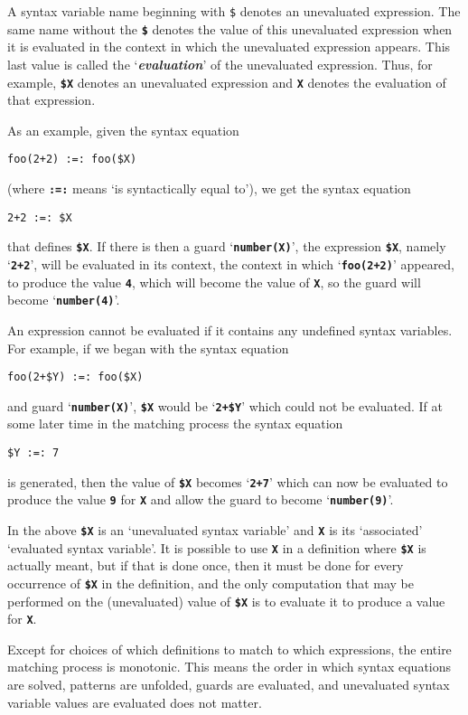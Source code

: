 \documentclass[12pt]{article}
\makeatletter
\newcommand{\TT}[1]{{\tt \bfseries #1}}
\newcommand{\key}[1]{{\bf \em #1}\index{#1}}
\newcommand{\ttmnbkey}[2]{{\tt #1}\index{#1@{\tt #1}!#2}}
\makeatother
\begin{document}
A syntax variable name beginning with
\ttmnbkey{\$}{in syntax variable name} denotes an unevaluated
expression.  The same name without the \TT{\$} denotes the value
of this unevaluated expression when it is evaluated
in the context in which the unevaluated expression appears.
This last value is called the `\key{evaluation}' of the unevaluated
expression.  Thus, for example, \TT{\$X} denotes an unevaluated
expression and \TT{X} denotes the evaluation of that expression.

As an example, given the syntax equation
\begin{center}
\verb|foo(2+2) :=: foo($X)|
\end{center}
(where \TT{:=:} means `is syntactically equal to'), we get
the syntax equation
\begin{center}
\verb|2+2 :=: $X|
\end{center}
that defines \TT{\$X}.  If there is then a guard `\TT{number(X)}',
the expression \TT{\$X}, namely `\TT{2+2}',
will be evaluated in its context, the context in which `\TT{foo(2+2)}'
appeared, to produce the value \TT{4}, which will become the value of
\TT{X}, so the guard will become `\TT{number(4)}'.

An expression cannot be evaluated if it contains any undefined syntax
variables.  For example, if we began with the syntax equation
\begin{center}
\verb|foo(2+$Y) :=: foo($X)|
\end{center}
and guard `\TT{number(X)}', \TT{\$X} would be `\TT{2+\$Y}' which
could not be evaluated.  If at some later time in the matching process
the syntax equation
\begin{center}
\verb|$Y :=: 7|
\end{center}
is generated, then the value of \TT{\$X} becomes `\TT{2+7}'
which can now be evaluated to produce the value \TT{9} for \TT{X}
and allow the guard to become `\TT{number(9)}'.

In the above \TT{\$X} is an `unevaluated syntax variable' and
\TT{X} is its `associated' `evaluated syntax variable'.  It is
possible to use \TT{X} in a definition where \TT{\$X} is actually
meant, but if that is done once, then it must be done for every occurrence
of \TT{\$X} in the definition, and the only computation that may be
performed on the (unevaluated) value of \TT{\$X} is to evaluate it to
produce a value for \TT{X}.

Except for choices of which definitions to match to which expressions,
the entire matching process is monotonic.  This means the order in which
syntax equations are solved, patterns are unfolded, guards are evaluated,
and unevaluated syntax variable values are evaluated does not matter.
\end{document}
